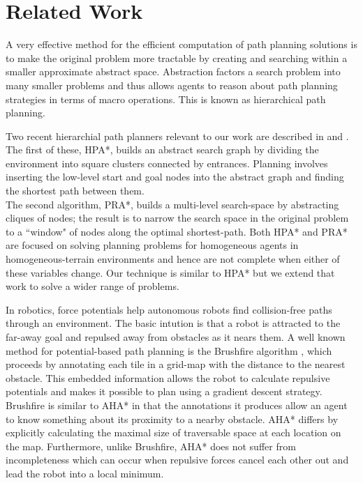 \section{Related Work}
A very effective method for the efficient computation of path planning solutions is to make the original problem more tractable by creating and searching within a smaller approximate abstract space. Abstraction factors a search problem into many smaller problems and thus allows agents to reason about path planning strategies in terms of macro operations. This is known as hierarchical path planning. 
\par
\indent Two recent hierarchial path planners relevant to our work are described in \cite{botea04} and \cite{sturtevant05}\cite{bulitko07}. The first of these, HPA*, builds an  abstract search graph by dividing the environment into square clusters connected by entrances. Planning involves inserting the low-level start and goal nodes into the abstract graph and finding the shortest path between them. \\
The second algorithm, PRA*, builds a multi-level search-space by abstracting cliques of nodes; the result is to narrow the search space in the original problem to a ``window" of nodes along the optimal shortest-path.
Both HPA* and PRA* are focused on solving planning problems for homogeneous agents in homogeneous-terrain environments and hence are not complete when either of these variables change. 
Our technique is similar to HPA* but we extend that work to solve a wider range of problems. 
\par 
\indent In robotics, force potentials help autonomous robots find collision-free paths through an environment. The basic intution is that a robot is attracted to the far-away goal and repulsed away from obstacles as it nears them. A well known method for potential-based path planning is the Brushfire algorithm \cite{latombe91}, which proceeds by annotating each tile in a grid-map with the distance to the nearest obstacle. This embedded information allows the robot to calculate repulsive potentials and makes it possible to plan using a gradient descent strategy. 
Brushfire is similar to AHA* in that the annotations it produces allow an agent to know something about its proximity to a nearby obstacle. 
AHA* differs by explicitly calculating the maximal size of traversable space at each location on the map. 
Furthermore, unlike Brushfire, AHA* does not suffer from incompleteness which can occur when repulsive forces cancel each other out and lead the robot into a local minimum. 
